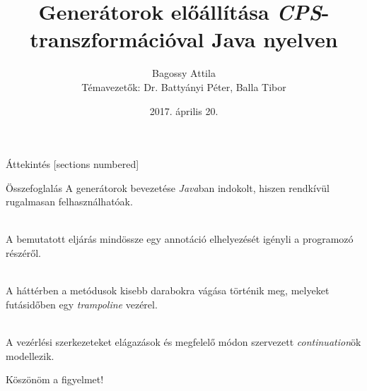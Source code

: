 \documentclass{beamer}
\title{Generátorok előállítása \textit{CPS}-transzformációval Java nyelven}
\date{2017. április 20.}
\author[My name]{Bagossy Attila\\ \footnotesize Témavezetők: Dr. Battyányi Péter, Balla Tibor \vspace{5em}}
\institute{Debreceni Egyetem, Informatikai Kar, Számítógéptudományi Tanszék}
\begin{document}
  \maketitle

  \begin{frame}{Áttekintés}
    [sections numbered]
    \tableofcontents[hideallsubsections]
  \end{frame}

  

  

  

  

  \begin{frame}{Összefoglalás}
    A generátorok bevezetése \textit{Java}ban indokolt, hiszen rendkívül rugalmasan felhasználhatóak.

    \hfill \\

    A bemutatott eljárás mindössze egy annotáció elhelyezését igényli a programozó részéről.

    \hfill \\

    A háttérben a metódusok kisebb darabokra vágása történik meg, melyeket futásidőben egy \textit{trampoline} vezérel.

    \hfill \\

    A vezérlési szerkezeteket elágazások és megfelelő módon szervezett \textit{continuation}ök modellezik.
  \end{frame}

  \begin{frame}[standout]
    Köszönöm a figyelmet!
  \end{frame}
\end{document}
